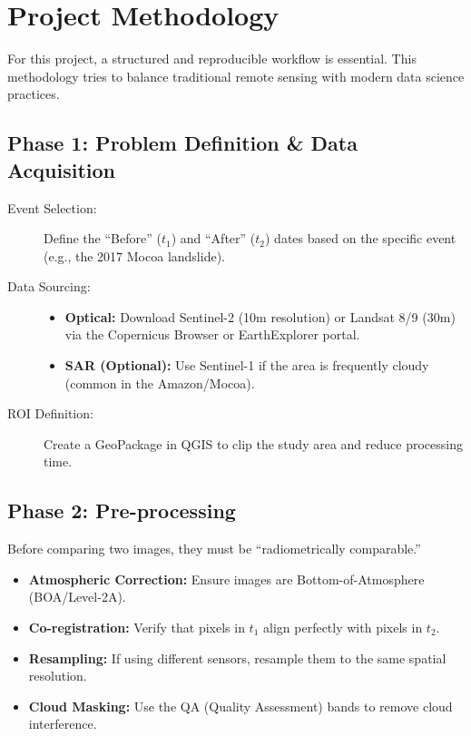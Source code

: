 \documentclass{article}
\begin{document}
\section{Project Methodology}

For this project, a structured and reproducible workflow is essential. This methodology tries to balance traditional remote sensing with modern data science practices.

\subsection*{Phase 1: Problem Definition \& Data Acquisition}
\begin{description}
    \item[Event Selection:] Define the ``Before'' ($t_1$) and ``After'' ($t_2$) dates based on the specific event (e.g., the 2017 Mocoa landslide).
    \item[Data Sourcing:] \text{}
    \begin{itemize}
        \item \textbf{Optical:} Download Sentinel-2 (10m resolution) or Landsat 8/9 (30m) via the Copernicus Browser or EarthExplorer portal.
        \item \textbf{SAR (Optional):} Use Sentinel-1 if the area is frequently cloudy (common in the Amazon/Mocoa).
    \end{itemize}
    \item[ROI Definition:] Create a GeoPackage in QGIS to clip the study area and reduce processing time.
\end{description}

\subsection*{Phase 2: Pre-processing}
Before comparing two images, they must be ``radiometrically comparable.''
\begin{itemize}
    \item \textbf{Atmospheric Correction:} Ensure images are Bottom-of-Atmosphere (BOA/Level-2A).
    \item \textbf{Co-registration:} Verify that pixels in $t_1$ align perfectly with pixels in $t_2$.
    \item \textbf{Resampling:} If using different sensors, resample them to the same spatial resolution.
    \item \textbf{Cloud Masking:} Use the QA (Quality Assessment) bands to remove cloud interference.
\end{itemize}
\end{document}
